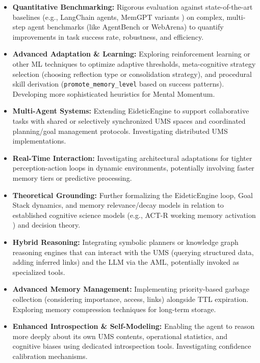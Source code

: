\documentclass[12pt,a4paper]{article}
\newcommand{\code}[1]{\nolinkurl{#1}}
\begin{document}
\begin{itemize}
    \item \textbf{Quantitative Benchmarking:} Rigorous evaluation against state-of-the-art baselines (e.g., LangChain agents, MemGPT variants \cite{Ref12}) on complex, multi-step agent benchmarks (like AgentBench or WebArena) to quantify improvements in task success rate, robustness, and efficiency.

    \item \textbf{Advanced Adaptation \& Learning:} Exploring reinforcement learning or other ML techniques to optimize adaptive thresholds, meta-cognitive strategy selection (choosing reflection type or consolidation strategy), and procedural skill derivation (\code{promote\_memory\_level} based on success patterns). Developing more sophisticated heuristics for Mental Momentum.

    \item \textbf{Multi-Agent Systems:} Extending EideticEngine to support collaborative tasks with shared or selectively synchronized UMS spaces and coordinated planning/goal management protocols. Investigating distributed UMS implementations.

    \item \textbf{Real-Time Interaction:} Investigating architectural adaptations for tighter perception-action loops in dynamic environments, potentially involving faster memory tiers or predictive processing.

    \item \textbf{Theoretical Grounding:} Further formalizing the EideticEngine loop, Goal Stack dynamics, and memory relevance/decay models in relation to established cognitive science models (e.g., ACT-R working memory activation \cite{Ref1, Ref2}) and decision theory.

    \item \textbf{Hybrid Reasoning:} Integrating symbolic planners or knowledge graph reasoning engines that can interact with the UMS (querying structured data, adding inferred links) and the LLM via the AML, potentially invoked as specialized tools.

    \item \textbf{Advanced Memory Management:} Implementing priority-based garbage collection (considering importance, access, links) alongside TTL expiration. Exploring memory compression techniques for long-term storage.

    \item \textbf{Enhanced Introspection \& Self-Modeling:} Enabling the agent to reason more deeply about its own UMS contents, operational statistics, and cognitive biases using dedicated introspection tools. Investigating confidence calibration mechanisms.


\end{itemize}
\end{document}
